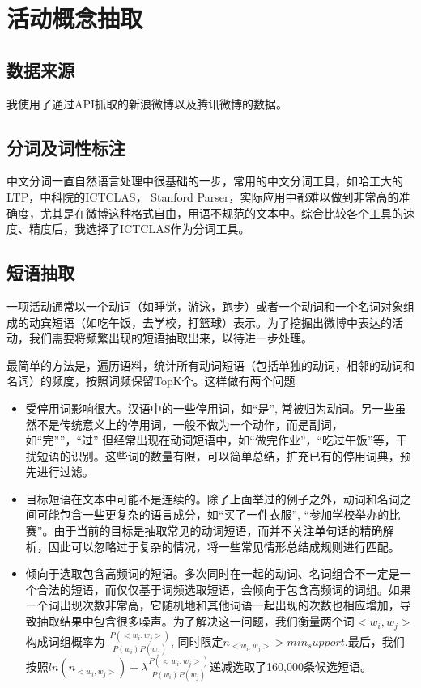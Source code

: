 
\chapter{活动概念抽取}
\section{数据来源}
我使用了通过API抓取的新浪微博以及腾讯微博的数据。

\section{分词及词性标注}
中文分词一直自然语言处理中很基础的一步，常用的中文分词工具，如哈工大的LTP，中科院的ICTCLAS， Stanford Parser，实际应用中都难以做到非常高的准确度，尤其是在微博这种格式自由，用语不规范的文本中。综合比较各个工具的速度、精度后，我选择了ICTCLAS作为分词工具。

\section{短语抽取}
一项活动通常以一个动词（如睡觉，游泳，跑步）或者一个动词和一个名词对象组成的动宾短语（如吃午饭，去学校，打篮球）表示。为了挖掘出微博中表达的活动，我们需要将频繁出现的短语抽取出来，以待进一步处理。

最简单的方法是，遍历语料，统计所有动词短语（包括单独的动词，相邻的动词和名词）的频度，按照词频保留TopK个。这样做有两个问题
\begin{itemize}
\item 受停用词影响很大。汉语中的一些停用词，如``是'', 常被归为动词。另一些虽然不是传统意义上的停用词，一般不做为一个动作，而是副词，如``完''”，``过'' 但经常出现在动词短语中，如``做完作业''，``吃过午饭''等，干扰短语的识别。这些词的数量有限，可以简单总结，扩充已有的停用词典，预先进行过滤。
\item 目标短语在文本中可能不是连续的。除了上面举过的例子之外，动词和名词之间可能包含一些更复杂的语言成分，如``买了一件衣服'', ``参加学校举办的比赛''。由于当前的目标是抽取常见的动词短语，而并不关注单句话的精确解析，因此可以忽略过于复杂的情况，将一些常见情形总结成规则进行匹配。
\item 倾向于选取包含高频词的短语。多次同时在一起的动词、名词组合不一定是一个合法的短语，而仅仅基于词频选取短语，会倾向于包含高频词的词组。如果一个词出现次数非常高，它随机地和其他词语一起出现的次数也相应增加，导致抽取结果中包含很多噪声。为了解决这一问题，我们衡量两个词$<w_i, w_j>$构成词组概率为
$\frac{P(<w_i, w_j>)}{P(w_i)P(w_j)}$, 同时限定$n_{<w_i,w_j>} > min_support$.最后，我们按照$ln(n_{<w_i, w_j>}) + \lambda\frac{P(<w_i, w_j>)}{P(w_i)P(w_j)}$递减选取了160,000条候选短语。
\end{itemize}

